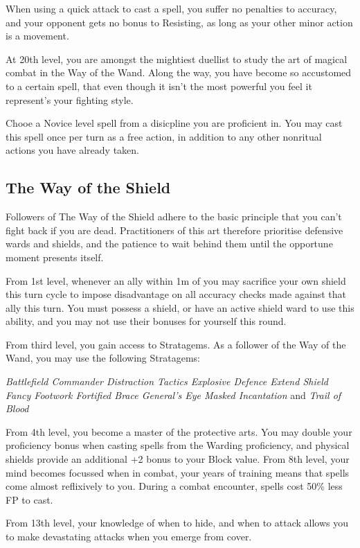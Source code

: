 {{	When using a quick attack to cast a spell, you suffer no penalties to accuracy, and your opponent gets no bonus to Resisting, as long as your other minor action is a movement. 
}
{
At 20th level, you are amongst the mightiest duellist to study the art of magical combat in the Way of the Wand. Along the way, you have become so accustomed to a certain spell, that \minus{} even though it isn't the most powerful \minus{} you feel it represent's your fighting style.  

Chooe a Novice level spell from a disicpline you are proficient in. You may cast this spell once per turn as a free action, in addition to any other non\minus{}ritual actions you have already taken.
}

\subsection{\bf The Way of the Shield}

Followers of The Way of the Shield adhere to the basic principle that you can't fight back if you are dead. Practitioners of this art therefore prioritise defensive wards and shields, and the patience to wait behind them until the opportune moment presents itself. 


From 1st level, whenever an ally within 1m of you may sacrifice your own shield this turn cycle to impose disadvantage on all accuracy checks made against that ally this turn. You must possess a shield, or have an active shield ward to use this ability, and you may not use their bonuses for yourself this round. 



From third level, you gain access to Stratagems. As a follower of the Way of the Wand, you may use the following Stratagems:

{\it 
Battlefield Commander\comma{} Distraction Tactics\comma{} Explosive Defence\comma{} Extend Shield\comma{} Fancy Footwork\comma{} Fortified Brace\comma{} General’s Eye\comma{} Masked Incantation } and {\it Trail of Blood
}

{
	From 4th level, you become a master of the protective arts. 	You may double your proficiency bonus when casting spells from the Warding proficiency, and physical shields provide an additional +2 bonus to your Block value. 
}
{
	From 8th level, your mind becomes focussed when in combat, your years of training means that spells come almost reflixively to you. During a combat encounter, spells cost 50\% less FP to cast. 
}
{
	From 13th level, your knowledge of when to hide, and when to attack allows you to make devastating attacks when you emerge from cover.  
	
}}
